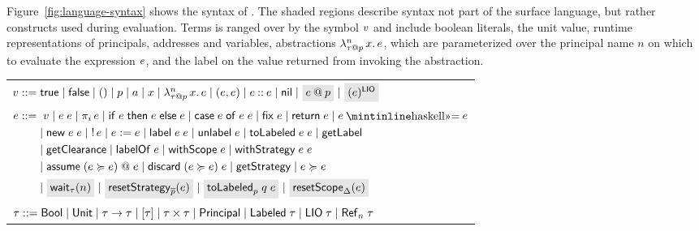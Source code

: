 Figure~\ref{fig:language-syntax} shows the syntax of \lang. The shaded regions describe syntax not part of the surface language, but rather constructs used during evaluation. Terms is ranged over by the symbol $v$ and include boolean literals, the unit value, runtime representations of principals, addresses and variables, abstractions $\lambda^{n}_{\tau \mathbin{@} p}\,x.\,e$, which are parameterized over the principal name $n$ on which to evaluate the expression $e$, and the label on the value returned from invoking the abstraction.

\begin{figure*}
    \centering
    \begin{tabular}{l}
         $\val ::= \true \mid \false \mid () \mid p \mid \addr \mid x \mid \abs{n}{\lb{p}{\type}}{x}{\expr} \mid (\expr, \expr) \mid \cons{\expr}{\expr} \mid \nil \mid \graybox{\lb{p}{\expr}} \mid \graybox{\lio{\expr}}$ \\
         $\begin{aligned}[t]
         \expr ::=&\;\; \val \mid \app{\expr}{\expr} \mid \proj{i}{\expr} \mid \ifexpr{\expr}{\expr}{\expr} \mid \case{\expr}{\expr}{\expr} \mid \fix{\expr} \mid \return{\expr} \mid \bind{\expr}{\expr} \\ &\mid
         \new{\expr}{\expr} \mid \readref{\expr} \mid \writeref{\expr}{\expr} \mid \Label{\expr}{\expr} \mid \unlabel{\expr} \mid
         \tolabeled{\expr}{\expr} \mid \getlabel \\ &\mid \getclearance \mid \labelof{\expr} \mid \withscope{\expr} \mid \withstrategy{\expr}{\expr} \\ &\mid \adddelegate{\expr}{\expr}{\expr} \mid \removedelegate{\expr}{\expr}{\expr} \mid \getstrategy \mid \expr \actsfor \expr \\ &\mid
         \graybox{\wait{n}[\type]} \mid \graybox{\resetstrategy{\overline{p}}{\expr}} \mid \graybox{\resetTolabeled{p}{q}{\expr}} \mid \graybox{\resetscope{\scope}{\expr}}
         \end{aligned}$ \\
         $\type ::= \bool \mid \unit \mid \func{\type}{\type} \mid \listtype{\type} \mid \pair{\type}{\type} \mid \labeltype \mid \labeled{\type} \mid \liotype{\type} \mid \reftype[n]{\type}$ \\
    \end{tabular}
    \caption{The \lang{} language}
    \label{fig:language-syntax}
\end{figure*}

